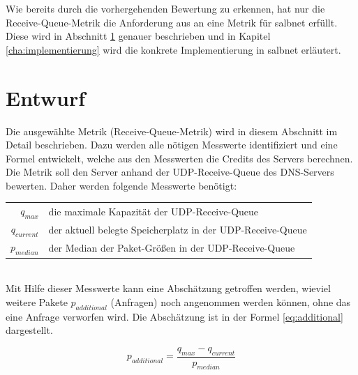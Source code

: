 \documentclass[a4paper, 12pt, BCOR10mm, DIV12, toc=bibliography, toc=listof, german]{scrbook}
\begin{document}
		Wie bereits durch die vorhergehenden Bewertung zu erkennen, hat nur die Receive-Queue-Metrik die
		Anforderung aus \cite{scsczile2008} an eine Metrik für salbnet erfüllt. Diese wird in Abschnitt
		\ref{sec:entwurf} genauer beschrieben und in Kapitel \ref{cha:implementierung} wird die
		konkrete Implementierung in salbnet erläutert.


		\section{Entwurf} %
		\label{sec:entwurf}

		Die ausgewählte Metrik (Receive-Queue-Metrik) wird in diesem Abschnitt im Detail beschrieben.
		Dazu werden alle nötigen Messwerte identifiziert und eine Formel entwickelt, welche aus den
		Messwerten die Credits des Servers berechnen. Die Metrik soll den Server anhand der
		UDP-Receive-Queue des DNS-Servers bewerten. Daher werden folgende Messwerte benötigt: $~$\\
		
		\begin{tabular}{rl}
			$q_{max}$		  & die maximale Kapazität der UDP-Receive-Queue\\
			$q_{current}$ &	der aktuell belegte Speicherplatz in der UDP-Receive-Queue\\
			$p_{median}$  &	der Median der Paket-Größen in der UDP-Receive-Queue\\
		\end{tabular}
		
		$~$\\
		Mit Hilfe dieser Messwerte kann eine Abschätzung getroffen werden, wieviel weitere Pakete
		$p_{additional}$ (Anfragen) noch angenommen werden können, ohne das eine Anfrage verworfen wird.
		Die Abschätzung ist in der Formel \ref{eq:additional} dargestellt. 

		\begin{equation}
			p_{additional} = \frac{q_{max} - q_{current}}{p_{median}}
			\label{eq:additional}
		\end{equation}
\end{document}
